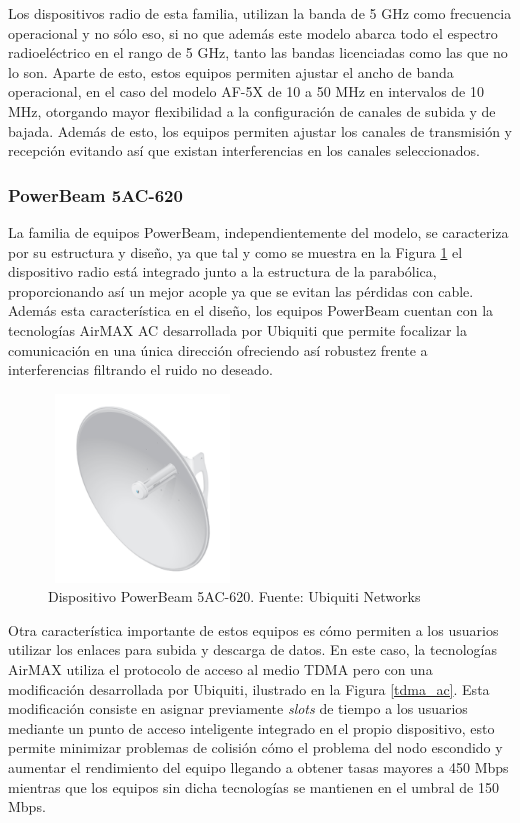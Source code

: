  Los dispositivos radio de esta familia, utilizan la banda de 5 GHz como frecuencia operacional y no sólo eso, si no que además este modelo abarca todo el espectro radioeléctrico en el rango de 5 GHz, tanto las bandas licenciadas como las que no lo son. Aparte de esto, estos equipos permiten ajustar el ancho de banda operacional, en el caso del modelo AF-5X de 10 a 50 MHz en intervalos de 10 MHz, otorgando mayor flexibilidad a la configuración de canales de subida y de bajada. Además de esto, los equipos permiten ajustar los canales de transmisión y recepción evitando así que existan interferencias en los canales seleccionados.
	
\subsubsection{PowerBeam 5AC-620}
La familia de equipos PowerBeam, independientemente del modelo, se caracteriza por su estructura y diseño, ya que tal y como se muestra en la Figura \ref{powerBeam} el dispositivo radio está integrado junto a la estructura de la parabólica, proporcionando así un mejor acople ya que se evitan las pérdidas con cable. Además esta característica en el diseño, los equipos PowerBeam cuentan con la tecnologías AirMAX AC desarrollada por Ubiquiti que permite focalizar la comunicación en una única dirección ofreciendo así robustez frente a interferencias filtrando el ruido no deseado.

\begin{figure}[H]
		\centering
		\includegraphics[width=5cm,height=5cm]{img/powerbeam.PNG}
		\caption{Dispositivo PowerBeam 5AC-620. Fuente: Ubiquiti Networks}
		\label{powerBeam}
\end{figure}

Otra característica importante de estos equipos es cómo permiten a los usuarios utilizar los enlaces para subida y descarga de datos. En este caso, la tecnologías AirMAX utiliza el protocolo de acceso al medio TDMA pero con una modificación desarrollada por Ubiquiti, ilustrado en la Figura \ref{tdma_ac}. Esta modificación consiste en asignar previamente \textit{slots} de tiempo a los usuarios mediante un punto de acceso inteligente integrado en el propio dispositivo, esto permite minimizar problemas de colisión cómo el problema del nodo escondido y aumentar el rendimiento del equipo llegando a obtener tasas mayores a 450 Mbps mientras que los equipos sin dicha tecnologías se mantienen en el umbral de 150 Mbps.
	
